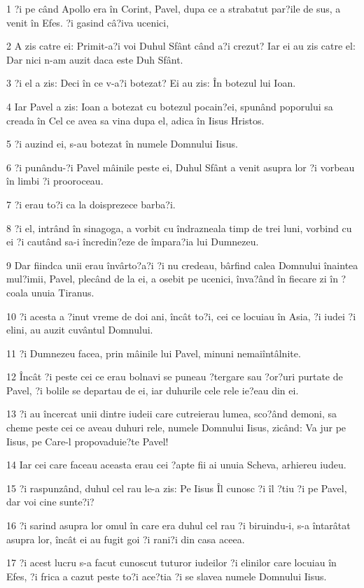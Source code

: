 \par 1 ?i pe când Apollo era în Corint, Pavel, dupa ce a strabatut par?ile de sus, a venit în Efes. ?i gasind câ?iva ucenici,
\par 2 A zis catre ei: Primit-a?i voi Duhul Sfânt când a?i crezut? Iar ei au zis catre el: Dar nici n-am auzit daca este Duh Sfânt.
\par 3 ?i el a zis: Deci în ce v-a?i botezat? Ei au zis: În botezul lui Ioan.
\par 4 Iar Pavel a zis: Ioan a botezat cu botezul pocain?ei, spunând poporului sa creada în Cel ce avea sa vina dupa el, adica în Iisus Hristos.
\par 5 ?i auzind ei, s-au botezat în numele Domnului Iisus.
\par 6 ?i punându-?i Pavel mâinile peste ei, Duhul Sfânt a venit asupra lor ?i vorbeau în limbi ?i prooroceau.
\par 7 ?i erau to?i ca la doisprezece barba?i.
\par 8 ?i el, intrând în sinagoga, a vorbit cu îndrazneala timp de trei luni, vorbind cu ei ?i cautând sa-i încredin?eze de împara?ia lui Dumnezeu.
\par 9 Dar fiindca unii erau învârto?a?i ?i nu credeau, bârfind calea Domnului înaintea mul?imii, Pavel, plecând de la ei, a osebit pe ucenici, înva?ând în fiecare zi în ?coala unuia Tiranus.
\par 10 ?i acesta a ?inut vreme de doi ani, încât to?i, cei ce locuiau în Asia, ?i iudei ?i elini, au auzit cuvântul Domnului.
\par 11 ?i Dumnezeu facea, prin mâinile lui Pavel, minuni nemaiîntâlnite.
\par 12 Încât ?i peste cei ce erau bolnavi se puneau ?tergare sau ?or?uri purtate de Pavel, ?i bolile se departau de ei, iar duhurile cele rele ie?eau din ei.
\par 13 ?i au încercat unii dintre iudeii care cutreierau lumea, sco?ând demoni, sa cheme peste cei ce aveau duhuri rele, numele Domnului Iisus, zicând: Va jur pe Iisus, pe Care-l propovaduie?te Pavel!
\par 14 Iar cei care faceau aceasta erau cei ?apte fii ai unuia Scheva, arhiereu iudeu.
\par 15 ?i raspunzând, duhul cel rau le-a zis: Pe Iisus Îl cunosc ?i îl ?tiu ?i pe Pavel, dar voi cine sunte?i?
\par 16 ?i sarind asupra lor omul în care era duhul cel rau ?i biruindu-i, s-a întarâtat asupra lor, încât ei au fugit goi ?i rani?i din casa aceea.
\par 17 ?i acest lucru s-a facut cunoscut tuturor iudeilor ?i elinilor care locuiau în Efes, ?i frica a cazut peste to?i ace?tia ?i se slavea numele Domnului Iisus.
